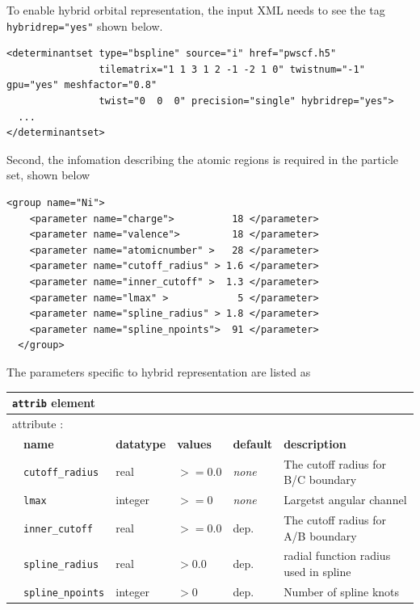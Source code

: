 To enable hybrid orbital representation, the input XML needs to see the tag \texttt{hybridrep="yes"} shown below.
\begin{lstlisting}[caption=Hybrid orbital representation input example.\label{listing:hybridrep}]
<determinantset type="bspline" source="i" href="pwscf.h5"
                tilematrix="1 1 3 1 2 -1 -2 1 0" twistnum="-1" gpu="yes" meshfactor="0.8"
                twist="0  0  0" precision="single" hybridrep="yes">
  ...
</determinantset>
\end{lstlisting}
Second, the infomation describing the atomic regions is required in the particle set, shown below
\begin{lstlisting}[caption=particleset elements for ions with information needed by hybrid orbital representation.\label{listing:hybridrep_particleset}]
  <group name="Ni">
    <parameter name="charge">          18 </parameter>
    <parameter name="valence">         18 </parameter>
    <parameter name="atomicnumber" >   28 </parameter>
    <parameter name="cutoff_radius" > 1.6 </parameter>
    <parameter name="inner_cutoff" >  1.3 </parameter>
    <parameter name="lmax" >            5 </parameter>
    <parameter name="spline_radius" > 1.8 </parameter>
    <parameter name="spline_npoints">  91 </parameter>
  </group>
\end{lstlisting}

The parameters specific to hybrid representation are listed as
\begin{table}[h]
\centering
\begin{tabularx}{\textwidth}{l l l l l l }
\hline
\multicolumn{6}{l}{\texttt{attrib} element} \\
\hline
\multicolumn{2}{l}{attribute      :} & \multicolumn{4}{l}{}\\
   &   \bfseries name            & \bfseries datatype & \bfseries values & \bfseries default   & \bfseries description \\
   &   \texttt{cutoff\_radius}             &  real            &  $>=0.0$    &  \textit{none}    & The cutoff radius for B/C boundary  \\
   &   \texttt{lmax}         &  integer            &  $>=0$ &  \textit{none} & Largetst angular channel \\
   &   \texttt{inner\_cutoff}             &  real            &  $>=0.0$    &  dep.    & The cutoff radius for A/B boundary  \\
   &   \texttt{spline\_radius}         &  real            &  $>0.0$ &  dep. & radial function radius used in spline \\
   &   \texttt{spline\_npoints}         &  integer            &  $>0$ &  dep. & Number of spline knots \\
  \hline
\end{tabularx}
\end{table}

